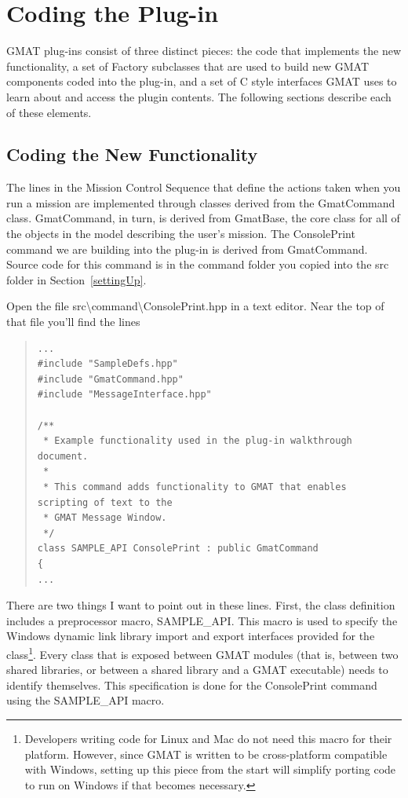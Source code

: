 \documentclass[10pt,letterpaper]{article}
\begin{document}
\section{Coding the Plug-in}

GMAT plug-ins consist of three distinct pieces: the code that implements the new functionality, a set of Factory subclasses that are used to build new GMAT components coded into the plug-in, and a set of C style interfaces GMAT uses to learn about and access the plugin contents.  The following sections describe each of these elements.

\subsection{Coding the New Functionality}

The lines in the Mission Control Sequence that define the actions taken when you run a mission are implemented through classes derived from the GmatCommand class.  GmatCommand, in turn, is derived from GmatBase, the core class for all of the objects in the model describing the user's mission.  The ConsolePrint command we are building into the plug-in is derived from GmatCommand.  Source code for this command is in the command folder you copied into the src folder in Section~\ref{settingUp}.

Open the file src{\textbackslash}command{\textbackslash}ConsolePrint.hpp in a text editor.  Near the top of that file you'll find the lines

\begin{quote}
\begin{verbatim}
...
#include "SampleDefs.hpp"
#include "GmatCommand.hpp"
#include "MessageInterface.hpp"

/** 
 * Example functionality used in the plug-in walkthrough document.
 *
 * This command adds functionality to GMAT that enables scripting of text to the
 * GMAT Message Window.
 */
class SAMPLE_API ConsolePrint : public GmatCommand
{
...
\end{verbatim}
\end{quote}

There are two things I want to point out in these lines.  First, the class definition includes a preprocessor macro, SAMPLE{\_}API.  This macro is used to specify the Windows dynamic link library import and export interfaces provided for the class\footnote{Developers writing code for Linux and Mac do not need this macro for their platform.  However, since GMAT is written to be cross-platform compatible with Windows, setting up this piece from the start will simplify porting code to run on Windows if that becomes necessary.}.  Every class that is exposed between GMAT modules (that is, between two shared libraries, or between a shared library and a GMAT executable) needs to identify themselves.  This specification is done for the ConsolePrint command using the SAMPLE{\_}API macro.  
\end{document}
